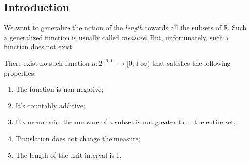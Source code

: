 
\subsection{Introduction}

We want to generalize the notion of the \textit{length} towards all 
the subsets of $\mathbb{R}$.
Such a generalized function is usually called \textit{measure}.
But, unfortunately, such a function does not exist.

\begin{theorem}
\label{the:measureNotExists}
    There exist no such function $\mu: 2^{[0,1]} \to [0, +\infty)$ that satisfies the 
    following properties:
    \begin{enumerate}
        \item {
            The function is non-negative;
        }
        \item {
            It's countably additive;
        }
        \item {
            It's monotonic: the measure of a subset is not greater than the entire set;
        }
        \item {
            Translation does not change the measure;
        }
        \item {
            The length of the unit interval is 1.
        }
    \end{enumerate}
\end{theorem}


